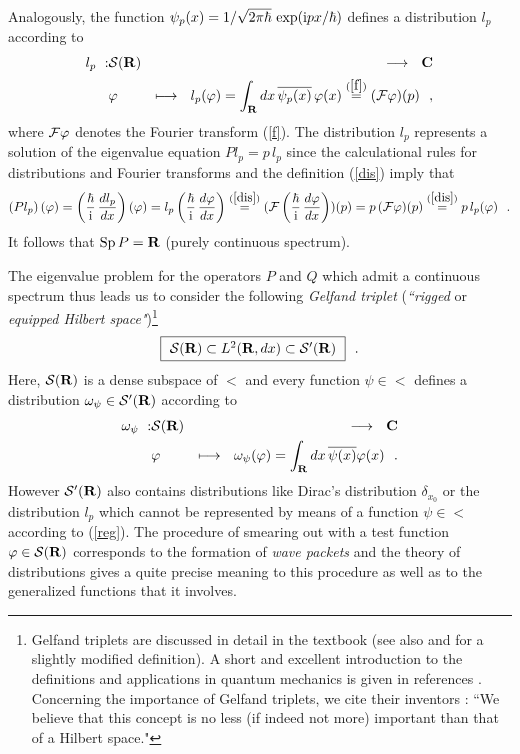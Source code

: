 \documentclass[a4wide,12pt]{report}
\begin{document}
Analogously, the function 
$\psi_p (x) = 1/\sqrt{2\pi \hbar}
\  {\rm exp} ( {\rm i} px / \hbar)$
defines a distribution $l_p$ according to 
\begin{eqnarray}
\label{dis}
l_p  \ : & {\cal S}({\bf R})  & \longrightarrow \ \ {\bf C}
\\
 & \varphi & \longmapsto \ \
l_p (\varphi ) = \int_{{\bf R}} dx \, \overline{\psi_p (x)} \,
\varphi (x) 
\stackrel{(\ref{f})}{=} 
({\cal F} \varphi ) (p)
\ \ ,
\nonumber
\end{eqnarray}
 where ${\cal F} \varphi$ 
 denotes the Fourier transform 
(\ref{f}).
The distribution $l_p$ represents a solution of the eigenvalue equation 
$Pl_p = p \, l_p$ since the 
calculational rules for distributions and Fourier transforms
\cite{sg,gv} and the definition (\ref{dis}) imply that 
\[
\left( Pl_p \right) (\varphi) =
\left( \displaystyle{\hbar \over {\rm i}} \, \displaystyle{dl_p \over dx} \right) (\varphi)
=
l_p \left( \displaystyle{\hbar \over {\rm i}} \, \displaystyle{d\varphi \over dx} \right) 
\stackrel{(\ref{dis})}{=}
( {\cal F}
\left( \displaystyle{\hbar \over {\rm i}} \, \displaystyle{d\varphi \over dx} \right) ) (p)
= p \, ( {\cal F} \varphi ) (p) 
\stackrel{(\ref{dis})}{=}
p \, l_p (\varphi)
\ \ .
\]
It follows that 
${\rm Sp} \, P = {\bf R}$ (purely continuous spectrum).
 
The eigenvalue problem for the operators $P$ and $Q$ which admit a
continuous spectrum 
thus leads us to consider the following 
{\em Gelfand triplet}
({\em ``rigged} or  {\em equipped 
Hilbert space"})\footnote{Gelfand triplets 
are discussed in detail in the textbook \cite{gv}
(see also \cite{bere} and \cite{jr} 
for a slightly modified definition).
A short and excellent introduction to the definitions 
and applications in quantum mechanics is given in references 
\cite{ber,blt,sg}. Concerning the importance
of Gelfand triplets, we cite their 
inventors \cite{gv}: ``We believe that this concept is no less 
(if indeed not more) 
important than that of a Hilbert space."}
\begin{equation}
\label{tri}
\fbox{\mbox{$ \
{\cal S}({\bf R}) \subset {L^2 ({{\bf R}},dx)} \subset {\cal S}^{\prime} ({\bf R}) \ $}}
\ \ .
\end{equation}
Here, ${\cal S}({\bf R})$ is a dense subspace of $\lt$ \cite{rs}
and every function 
$\psi \in \lt$ defines a distribution $\omega_{\psi} \in {\cal S}^{\prime} ({\bf R})$
according to 
\begin{eqnarray}
\omega_{\psi} \ : & {\cal S}({\bf R}) & \longrightarrow \ \ {\bf C}
\nonumber
\\
 & \varphi & \longmapsto \ \
\omega_{\psi} (\varphi) = \int_{{\bf R}} dx \, \overline{\psi(x)}
\varphi (x)
\ \ .
\label{reg}
\end{eqnarray}
 However ${\cal S}^{\prime} ({\bf R})$ also contains distributions  
 like Dirac's 
  distribution $\delta_{x_0}$ 
or the distribution $l_p$ which cannot be represented 
by means of a function $\psi \in \lt$ according to (\ref{reg}).
The procedure of smearing out with a test function 
$\varphi \in {\cal S}({\bf R})$ corresponds 
to the formation of {\em wave packets} and the theory of 
distributions gives a quite precise meaning to this procedure 
as well as to the generalized functions that it involves.   
\end{document}
